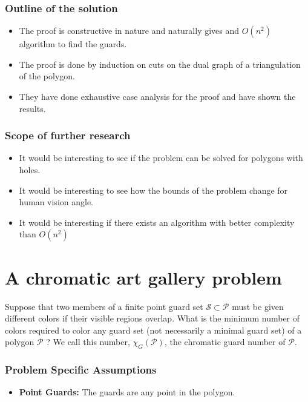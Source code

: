 \documentclass{Assignment}
\begin{document}
\subsubsection*{Outline of the solution}
\vspace{-0.3cm}
\begin{itemize}
    \itemsep-0.3em
    \item The proof is constructive in nature and naturally gives and $O(n^2)$ algorithm to find the guards.
    \item The proof is done by induction on cuts on the dual graph of a triangulation of the polygon.
    \item They have done exhaustive case analysis for the proof and have shown the results.
\end{itemize}
\vspace{-0.8cm}
\subsubsection*{Scope of further research}
\vspace{-0.3cm}
\begin{itemize}
    \itemsep-0.3em
    \item It would be interesting to see if the problem can be solved for polygons with holes.
    \item It would be interesting to see how the bounds of the problem change for human vision angle.
    \item It would be interesting if there exists an algorithm with better complexity than $O(n^2)$
\end{itemize}
\vspace{-0.7cm}
\section*{A chromatic art gallery problem\supercite{chromatic_art_gallery}}
\begin{problem}
    Suppose that two members of a finite point guard set $\mathcal{S} \subset \mathcal{P}$ must be given different colors if their visible regions overlap. What is the minimum number of colors required to color any guard set (not necessarily a minimal guard set) of a polygon $\mathcal{P}$ ? We call this number, $\chi_{G}(\mathcal{P})$, the chromatic guard number of $\mathcal{P}$.
\end{problem}
\vspace{-0.8cm}
\subsubsection*{Problem Specific Assumptions}
\vspace{-0.3cm}
\begin{itemize}
    \itemsep-0.3em
    \item {\bf Point Guards:} The guards are any point in the polygon.
\end{itemize}
\vspace{-0.8cm}
\end{document}
